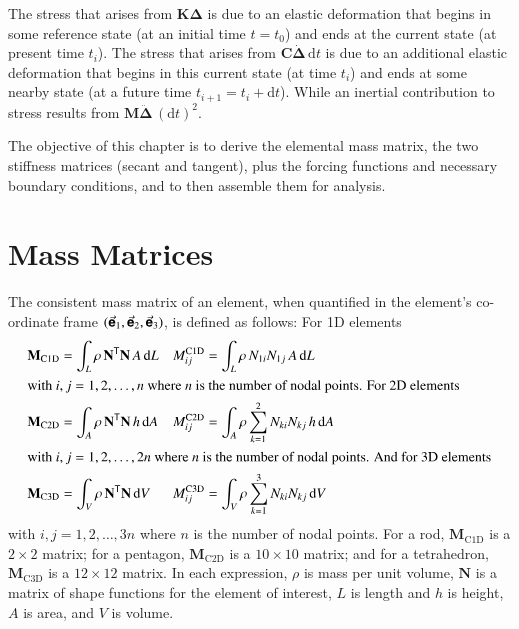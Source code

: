 The stress that arises from $\mathbf{K} \boldsymbol{\Delta}$ is due to an elastic deformation that begins in some reference state (at an initial time $t = t_0$) and ends at the current state (at present time $t_i$).  The stress that arises from $\mathbf{C} \dot{\boldsymbol{\Delta}} \, \mathrm{d}t$ is due to an additional elastic deformation that begins in this current state (at time $t_i$) and ends at some nearby state (at a future time $t_{i+1} = t_i + \mathrm{d}t$).  While an inertial contribution to stress results from $\mathbf{M} \ddot{\boldsymbol{\Delta}} \, (\mathrm{d}t)^2$.

The objective of this chapter is to derive the elemental mass matrix, the two stiffness matrices (secant and tangent), plus the forcing functions and necessary boundary conditions, and to then assemble them for analysis. 

\section{Mass Matrices}

The consistent mass matrix of an element, \cite{Archer65} when quantified in the element's co-ordinate frame $( \vec{\boldsymbol{\mathsf{e}}}_1 , \vec{\boldsymbol{\mathsf{e}}}_2 , \vec{\boldsymbol{\mathsf{e}}}_3 )$, is defined as follows:  For 1D elements
\begin{subequations}
    \label{consistentMassMatrix}
    \begin{align}
    \mathbf{M}_{\mathrm{C1D}} & = \int_{L} \rho \, \mathbf{N}^{\mathsf{T}} \mathbf{N} \,
    A \, \mathrm{d} L & M^{\mathrm{C1D}}_{ij} & = 
    \int_L \rho \, N_{1i} N_{1j} \, A \, \mathrm{d} L
    \label{consistentMassMatrix1D} \\
    \intertext{with $i,j = 1, 2, \ldots , n$ where $n$ is the number of nodal points. For 2D elements}
    \mathbf{M}_{\mathrm{C2D}} & = \int_{A} \rho \, \mathbf{N}^{\mathsf{T}} \mathbf{N} \,
    h \, \mathrm{d} A & M^{\mathrm{C2D}}_{ij} & =
    \int_A \rho \sum_{k=1}^2 N_{ki} N_{kj} \, h \, \mathrm{d} A
    \label{consistentMassMatrix2D} \\
    \intertext{with $i,j = 1 , 2, \ldots , 2n$ where $n$ is the number of nodal points.  And for 3D elements}
    \mathbf{M}_{\mathrm{C3D}} & = \int_{V} \rho \, \mathbf{N}^{\mathsf{T}} \mathbf{N} \,
    \mathrm{d} V & M^{\mathrm{C3D}}_{ij} & = 
    \int_V \rho \sum_{k=1}^3 N_{ki} N_{kj} \, \mathrm{d} V
    \label{consistentMassMatrix3D}
    \end{align}
\end{subequations}
with $i, j = 1, 2, \ldots , 3n$ where $n$ is the number of nodal points.  For a rod, $\mathbf{M}_{\mathrm{C1D}}$ is a $2 \! \times \! 2$ matrix; for a pentagon, $\mathbf{M}_{\mathrm{C2D}}$ is a $10 \! \times \! 10$ matrix; and for a tetrahedron, $\mathbf{M}_{\mathrm{C3D}}$ is a $12 \! \times \! 12$ matrix.  In each expression, $\rho$ is mass per unit volume, $\mathbf{N}$ is a matrix of shape functions for the element of interest, $L$ is length and $h$ is height, $A$ is area, and $V$ is volume.  

